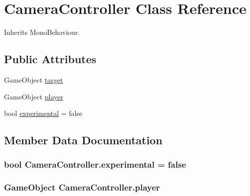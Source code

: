 \hypertarget{class_camera_controller}{}\section{Camera\+Controller Class Reference}
\label{class_camera_controller}


Inherits Mono\+Behaviour.

\subsection*{Public Attributes}
\begin{DoxyCompactItemize}
\item 
Game\+Object \hyperlink{class_camera_controller_a2a671c90de07af1a4f8b7530268e9f3a}{target}
\item 
Game\+Object \hyperlink{class_camera_controller_aae794ec2d17947f671ce0eaef9aac8b7}{player}
\item 
bool \hyperlink{class_camera_controller_a3bf01b53e04f17060497fe29a1b5178a}{experimental} = false
\end{DoxyCompactItemize}


\subsection{Member Data Documentation}
\subsubsection[{\texorpdfstring{experimental}{experimental}}]{\setlength{\rightskip}{0pt plus 5cm}bool Camera\+Controller.\+experimental = false}\hypertarget{class_camera_controller_a3bf01b53e04f17060497fe29a1b5178a}{}\label{class_camera_controller_a3bf01b53e04f17060497fe29a1b5178a}
\subsubsection[{\texorpdfstring{player}{player}}]{\setlength{\rightskip}{0pt plus 5cm}Game\+Object Camera\+Controller.\+player}\hypertarget{class_camera_controller_aae794ec2d17947f671ce0eaef9aac8b7}{}\label{class_camera_controller_aae794ec2d17947f671ce0eaef9aac8b7}
